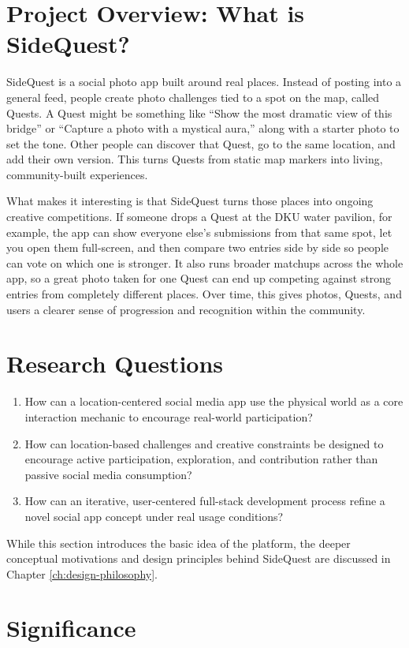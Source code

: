 \documentclass[12pt,a4paper,oneside]{report}
\begin{document}
\section{Project Overview: What is SideQuest?}
SideQuest is a social photo app built around real places. Instead of posting into a general feed, people create photo challenges tied to a spot on the map, called Quests. A Quest might be something like ``Show the most dramatic view of this bridge'' or ``Capture a photo with a mystical aura,'' along with a starter photo to set the tone. Other people can discover that Quest, go to the same location, and add their own version. This turns Quests from static map markers into living, community-built experiences.

What makes it interesting is that SideQuest turns those places into ongoing creative competitions. If someone drops a Quest at the DKU water pavilion, for example, the app can show everyone else’s submissions from that same spot, let you open them full-screen, and then compare two entries side by side so people can vote on which one is stronger. It also runs broader matchups across the whole app, so a great photo taken for one Quest can end up competing against strong entries from completely different places. Over time, this gives photos, Quests, and users a clearer sense of progression and recognition within the community.

\section{Research Questions}
\begin{enumerate}
  \item How can a location-centered social media app use the physical world as a core interaction mechanic to encourage real-world participation?
  \item How can location-based challenges and creative constraints be designed to encourage active participation, exploration, and contribution rather than passive social media consumption?
  \item How can an iterative, user-centered full-stack development process refine a novel social app concept under real usage conditions?
\end{enumerate}
While this section introduces the basic idea of the platform, the deeper conceptual motivations and design principles behind SideQuest are discussed in Chapter \ref{ch:design-philosophy}.

\section{Significance}
\end{document}
